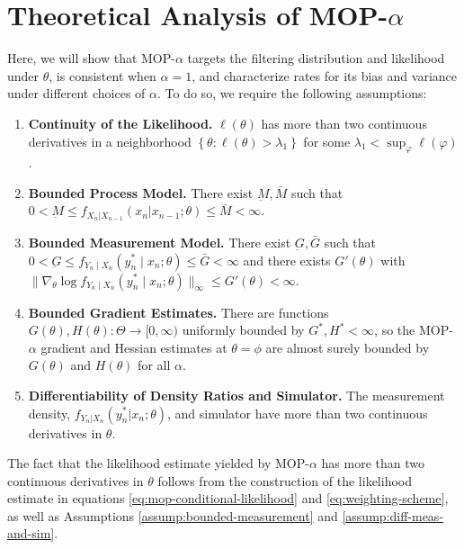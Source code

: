 \documentclass[9pt,twocolumn,pnasresearcharticle]{pnas-new}
\newcommand\arxiv[2]{#2} %
\begin{document}
\section{Theoretical Analysis of MOP-$\alpha$}
\label{sec:thms}

Here, we will show that MOP-$\alpha$ targets the filtering distribution and likelihood under $\theta$, is consistent when $\alpha=1$, and characterize rates for its bias and variance under different choices of $\alpha$. To do so, we require the following assumptions:

\begin{enumerate}[label=(A\arabic*),itemsep=-1.2ex] 
    \item \textbf{Continuity of the Likelihood.} $\ell(\theta)$ has more than two continuous derivatives in a neighborhood $\left\{\theta: \ell(\theta)>\lambda_1\right\}$ for some $\lambda_1<\sup _{\varphi} \ell(\varphi)$. \label{assump:conti-lik}
    \item \textbf{Bounded Process Model.} There exist $\underbar{M}, \bar{M}$ such that $0 < \underbar{M} \leq f_{X_n|X_{n-1}}(x_n | x_{n-1};\theta) \leq \bar{M} < \infty$. \label{assump:bounded-process}
    \item \textbf{Bounded Measurement Model.} There exist $\underbar{G}, \bar{G}$ such that $0<\underbar{G} \leq f_{Y_n \mid X_n}\left(y_n^* \mid x_n; \theta\right) \leq \bar{G}<\infty$ and there exists $G'(\theta)$ with $\|\nabla_\theta \log f_{Y_n \mid X_n}\left(y_n^* \mid x_n; \theta\right)\|_\infty \leq G'(\theta)< \infty$. \label{assump:bounded-measurement}
    \item \textbf{Bounded Gradient Estimates.} There are functions $G(\theta), H(\theta): \Theta \to [0,\infty)$ uniformly bounded by $G^*, H^*<\infty$, so the MOP-$\alpha$ gradient and Hessian estimates at $\theta=\phi$ are almost surely bounded by $G(\theta)$ and $H(\theta)$ for all $\alpha$. \label{assump:local-bounded-derivative}
    \item \textbf{Differentiability of Density Ratios and Simulator.} The measurement density, \arxiv{\\}{}$f_{Y_n|X_n}(y_n^*|x_n; \theta)$, and simulator have more than two continuous derivatives in $\theta$. \label{assump:diff-meas-and-sim}
\end{enumerate}

The fact that the likelihood estimate yielded by MOP-$\alpha$ has more than two continuous derivatives in $\theta$ follows from the construction of the likelihood estimate in equations \ref{eq:mop-conditional-likelihood} and \ref{eq:weighting-scheme}, as well as Assumptions \ref{assump:bounded-measurement} and \ref{assump:diff-meas-and-sim}. 
\end{document}
